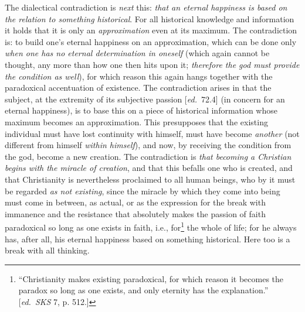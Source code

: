 \documentclass[12pt,a4paper,openany]{book}
\newcommand{\ed}[1]{{\small[\textit{ed.}\ #1]}}
\begin{document}
The dialectical contradiction is \emph{next} this: \emph{that an eternal happiness is based
on the relation to something historical}. For all historical knowledge and information
it holds that it is only an \emph{approximation} even at its maximum.
The contradiction is: to build one's eternal happiness on an approximation,
which can be done only \emph{when one has no eternal determination in oneself}
(which again cannot be thought, any more than how one
then hits upon it; \emph{therefore the god must provide the condition as well}), for which reason this
again hangs together with the paradoxical accentuation of existence.
The contradiction arises in that the subject, at the extremity of its subjective passion
\ed{72.4} (in concern for an eternal happiness), is to base
this on a piece of historical information whose maximum becomes an
approximation. This presupposes that the existing individual must have
lost continuity with himself, must have become \emph{another} (not different
from himself \emph{within himself}), and now, by receiving the condition from the god,
become a new creation. The contradiction is \emph{that becoming a Christian
begins with the miracle of creation}, and that this befalls one who is
created, and that Christianity is nevertheless proclaimed to all human beings,
who by it must be regarded \emph{as not existing}, since the miracle by which they
come into being must come in between, as actual, or as the expression for
the break with immanence and the resistance that absolutely makes the passion of faith
paradoxical so long as one exists in faith, i.e., for\footnote[76]{``Christianity makes existing paradoxical, for which reason it becomes the paradox so
long as one exists, and only eternity has the explanation.'' \ed{\emph{SKS} 7, p. 512.}}
the whole of life; for he always has, after all, his eternal happiness based
on something historical. Here too is a break with all thinking.
\end{document}
